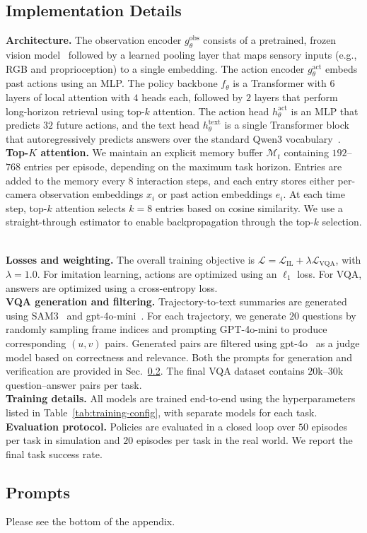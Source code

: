 \subsection{Implementation Details}\label{sec:impl}
\noindent
\textbf{Architecture.}
The observation encoder $g_\theta^{\text{obs}}$ consists of a pretrained, frozen vision model~\cite{crossmae} followed by a learned pooling layer that maps sensory inputs (e.g., RGB and proprioception) to a single embedding.
The action encoder $g_\theta^{\text{act}}$ embeds past actions using an MLP.
The policy backbone $f_\theta$ is a Transformer with $6$ layers of local attention with $4$ heads each, followed by $2$ layers that perform long-horizon retrieval using top-$k$ attention.
The action head $h_\theta^{\text{act}}$ is an MLP that predicts $32$ future actions, and the text head $h_\theta^{\text{text}}$ is a single Transformer block that autoregressively predicts answers over the standard Qwen3 vocabulary~\cite{qwen3}.
\\
\textbf{Top-$K$ attention.}
We maintain an explicit memory buffer $\mathcal{M}_t$ containing $192$--$768$ entries per episode, depending on the maximum task horizon.
Entries are added to the memory every $8$ interaction steps, and each entry stores either per-camera observation embeddings $x_i$ or past action embeddings $e_i$.
At each time step, top-$k$ attention selects $k=8$ entries based on cosine similarity.
We use a straight-through estimator to enable backpropagation through the top-$k$ selection.

\\
\noindent
\textbf{Losses and weighting.}
The overall training objective is $\mathcal{L} = \mathcal{L}_{\text{IL}} + \lambda \mathcal{L}_{\text{VQA}}$, with $\lambda=1.0$.
For imitation learning, actions are optimized using an $\ell_1$ loss.
For VQA, answers are optimized using a cross-entropy loss.
\\
\textbf{VQA generation and filtering.}
Trajectory-to-text summaries are generated using SAM3~\cite{sam3} and gpt-4o-mini~\cite{gpt-4o}.
For each trajectory, we generate $20$ questions by randomly sampling frame indices and prompting GPT-4o-mini to produce corresponding $(u, v)$ pairs.
Generated pairs are filtered using gpt-4o~\cite{gpt-4o} as a judge model based on correctness and relevance. Both the prompts for generation and verification are provided in Sec.~\ref{sec:app:prompts}.
The final VQA dataset contains $20$k--$30$k question--answer pairs per task.
\\

\textbf{Training details.}
All models are trained end-to-end using the hyperparameters listed in Table~\ref{tab:training-config}, with separate models for each task.
\\
\textbf{Evaluation protocol.}
Policies are evaluated in a closed loop over $50$ episodes per task in simulation and $20$ episodes per task in the real world.
We report the final task success rate.


\subsection{Prompts}\label{sec:app:prompts}
Please see the bottom of the appendix.
